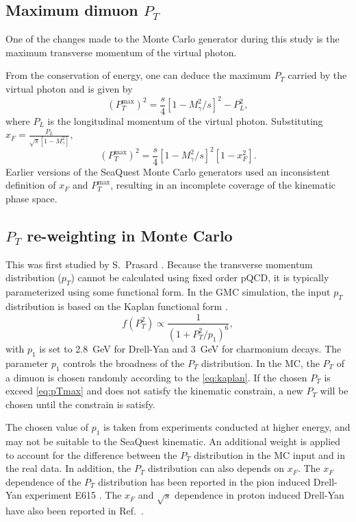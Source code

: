 \documentclass[../main.tex]{subfiles}
\begin{document}

\subsection{Maximum dimuon \texorpdfstring{$P_T$}{P\_T}}
One of the changes made to the Monte Carlo generator during this study
is the maximum transverse momentum of the virtual photon.

From the conservation of energy, one can deduce the  maximum $P_T$ carried by the virtual photon
and is given by
\begin{equation}
	\left(P_T^{\mathrm{max}}\right)^2 = \frac{s}{4} \left[1-M^2_\gamma/s\right]^2 - P_L^2,
\end{equation}
where $P_L$ is the longitudinal momentum of the virtual photon.
Substituting $x_F = \frac{P_L}{\sqrt{s}\left[1-M^2_\gamma\right]}$,
\begin{equation}
	\left(P_T^{\mathrm{max}}\right)^2 = \frac{s}{4} \left[1-M^2_\gamma/s\right]^2\left[1-x_F^2\right].
	\label{eq:pTmax}
\end{equation}
Earlier versions of the SeaQuest Monte Carlo generators used an inconsistent definition of $x_F$
and $P_T^{\mathrm{max}}$, resulting in an incomplete coverage of the kinematic phase space.

\subsection{\texorpdfstring{$P_T$}{P\_T} re-weighting in Monte Carlo}
This was first studied by S.~Prasard \cite{prasad2020}.
Because the transverse momentum distribution ($p_T$) cannot be calculated using
fixed order pQCD, it is typically parameterized using some functional form.
In the GMC simulation, the input $p_T$ distribution is based on the
Kaplan functional form \cite{kaplan1978}.
\begin{equation}
	f\left(P_T^2\right) \propto \frac{1}{\left(1+ P_T^2/p_1\right)^6},
	\label{eq:kaplan}
\end{equation}
with $p_1$ is set to \SI{2.8}{\GeV} for Drell-Yan and \SI{3}{\GeV} for charmonium
decays. The parameter $p_1$ controls the broadness
of the $P_T$ distribution. In the MC, the $P_T$ of a dimuon is chosen randomly
according to the \cref{eq:kaplan}. If the chosen $P_T$ is exceed \cref{eq:pTmax}
and does not satisfy the kinematic constrain, a new $P_T$ will be chosen until
the constrain is satisfy.

The chosen value of $p_1$ is taken from experiments conducted at higher
energy, and may not be suitable to the SeaQuest kinematic. An additional weight is
applied to account for the difference between the $P_T$ distribution in the MC input
and in the real data. In addition, the $P_T$ distribution can also depends on $x_F$.
The $x_F$ dependence of the $P_T$ distribution has been reported in the pion induced
Drell-Yan experiment E615 \cite{conway1989}. The $x_F$ and $\sqrt{s}$ dependence in
proton induced Drell-Yan have also been reported in Ref.~\cite{prasad2020}.
\end{document}
